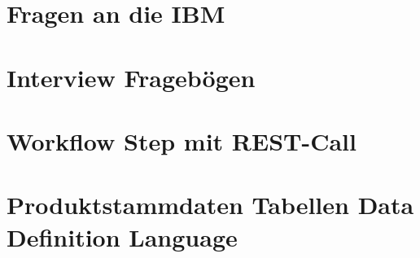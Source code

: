 \section{Fragen an die IBM}\label{app:ibm}



\section{Interview Fragebögen}\label{app:fragen}










\section{Workflow Step mit REST-Call}\label{app:db2prov}


\section{Produktstammdaten Tabellen Data Definition Language}\label{app:ddl}

\pagebreak